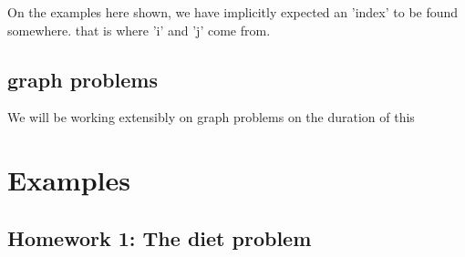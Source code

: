 \documentclass{textbook}
\begin{document}
On the examples here shown, we have implicitly expected an 'index' to be found somewhere. 
that is where 'i' and 'j' come from. 

\section{graph problems}

We will be working extensibly on graph problems on the duration of 
this 

\chapter{Examples}

\section[Homework 1]{Homework 1: The diet problem}
\end{document}
